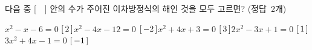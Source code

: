 다음 중 [\ \ ] 안의 수가 주어진 이차방정식의 해인 것을 모두 고르면? \mbox{(정답 2개)}
\begin{choicesii}{$x^2-x-6=0$ \quad $[\mkern3mu 2\mkern3mu ]$}{$x^2-4x-12=0$ \quad $[\mkern3mu -2\mkern3mu ]$}{$x^2+4x+3=0$ \quad $[\mkern3mu 3\mkern3mu ]$}{$2x^2-3x+1=0$ \quad $[\mkern3mu 1\mkern3mu ]$}{$3x^2+4x-1=0$ \quad $[\mkern3mu -1\mkern3mu ]$}\end{choicesii}
